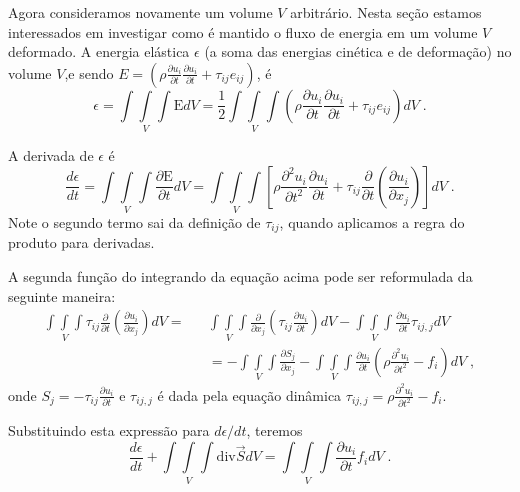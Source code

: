 Agora consideramos novamente um volume $V$ arbitr\'ario. Nesta
se\c{c}\~ao estamos interessados em investigar como \'e mantido o
fluxo de energia  em um volume $V$ deformado. A energia el\'astica $\epsilon$ (a soma das energias
cin\'etica e de deforma\c{c}\~ao) no volume $V$,e sendo $E=(
\rho\frac{\partial u_{i}}{\partial t}\frac{\partial u_{i}}{\partial t}+\tau_{ij}e_{ij})$,
\'e
\begin{equation}
\epsilon=\int \! \!\int\limits_{V} \! \!\int \mbox{E}dV=\frac{1}{2}\int \! \!\int\limits_{V} \! \!\int\left(
\rho\frac{\partial u_{i}}{\partial t}\frac{\partial u_{i}}{\partial t}+\tau_{ij}e_{ij}\right)dV \;.
\end{equation}

A derivada de $\epsilon$ \'e
\begin{equation}
\frac{d\epsilon}{dt}=\int \! \!\int\limits_{V} \! \!\int \frac{\partial \mbox{E}}{\partial t}dV=
\int \! \!\int\limits_{V} \! \!\int \left[\rho\frac{\partial^{2}
u_{i}}{\partial t^{2}} \frac{\partial u_{i}}{\partial t}+\tau_{ij}
\frac{\partial}{\partial t}\left(\frac{\partial u_{i}}{\partial
x_{j}}\right)\right]dV \;.
\end{equation}
Note o segundo termo sai da defini\c{c}\~ao de $\tau_{ij}$, quando aplicamos a regra do produto para derivadas.

A segunda fun\c{c}\~ao do integrando da equa\c{c}\~ao acima pode ser reformulada da seguinte
maneira:
\begin{equation}
\begin{array}{rcl}
\int \! \!\int\limits_{V} \! \!\int\tau_{ij}
\frac{\partial}{\partial t}\left(\frac{\partial u_{i}}{\partial
x_{j}}\right)dV=
&& \int \! \!\int\limits_{V} \! \!\int
\frac{\partial}{\partial x_{j}}\left(\tau_{ij}\frac{\partial
u_{i}}{\partial t}\right)dV- \int \! \!\int\limits_{V} \! \!\int
\frac{\partial u_{i}}{\partial t} \tau_{ij,j}dV \\
&& =-\int \! \!\int\limits_{V} \! \!\int \frac{\partial S_{j}}{\partial x_{j}}-
\int \! \!\int\limits_{V} \! \!\int\frac{\partial u_{i}}{\partial
t}\left(\rho\frac{\partial^{2} u_{i}}{\partial
t^{2}}-f_{i}\right)dV \;,
\end{array}
\end{equation}
onde $S_{j}=-\tau_{ij}\frac{\partial
u_{i}}{\partial t}$ e $\tau_{ij,j}$ \'e dada pela equa\c{c}\~ao din\^amica $\tau_{ij,j}=\rho
\frac{\partial^{2} u_{i}}{\partial t^{2}}-f_{i}$.

Substituindo esta express\~ao para $d\epsilon/dt$, teremos
\begin{equation}
\frac{d\epsilon}{dt}+\int \! \!\int\limits_{V} \! \!\int \mbox{div} \vec{S}dV=\int \! \!\int\limits_{V} \! \!\int
\frac{\partial u_{i}}{\partial t}f_{i}dV \;.
\end{equation}

